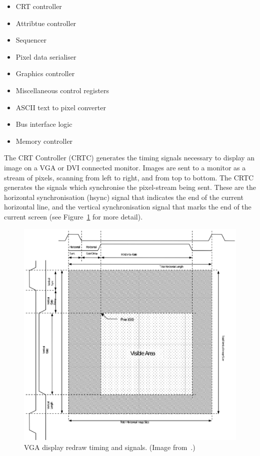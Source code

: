 \begin{itemize}
  \item CRT controller
  \item Attribtue controller
  \item Sequencer
  \item Pixel data serialiser
  \item Graphics controller
  \item Miscellaneous control registers
  \item ASCII text to pixel converter
  \item Bus interface logic
  \item Memory controller
\end{itemize}


The CRT Controller (CRTC)
generates the timing signals necessary to display an image on a VGA or DVI
connected monitor. Images are sent to a monitor as a stream of pixels, scanning
from left to right, and from top to bottom. The CRTC generates the signals which
synchronise the pixel-stream being sent. These are the horizontal
synchronisation
(hsync) signal that indicates the end of the current horizontal line, and the
vertical synchronisation signal that marks the end of the current screen (see
Figure~\ref{INTRO_CRT_Redraw} for more detail).

\begin{figure}[h!]
\begin{center}
\includegraphics[width=0.9\linewidth]{images/crt_redraw.eps}
\end{center}
\caption[VGA display redraw timing and signals]{VGA display redraw timing and
signals. (Image from~\cite{knutsson:fbg}.)}
\label{INTRO_CRT_Redraw}
\end{figure}

